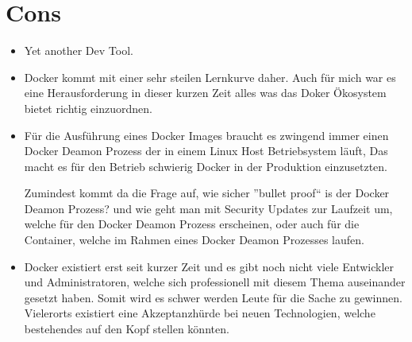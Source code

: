 \section{Cons}

\begin{itemize}

\item Yet another Dev Tool.

\item Docker kommt mit einer sehr steilen Lernkurve daher. Auch für mich war es eine Herausforderung
in dieser kurzen Zeit alles was das Doker Ökosystem bietet richtig einzuordnen.

\item Für die Ausführung eines Docker Images braucht es zwingend immer einen Docker Deamon Prozess der
in einem Linux Host Betriebsystem läuft, Das macht es für den Betrieb schwierig Docker in der
Produktion einzusetzten.

Zumindest kommt da die Frage auf, wie sicher ”bullet proof“ is der Docker Deamon Prozess? und wie
geht man mit Security Updates zur Laufzeit um, welche für den Docker Deamon Prozess erscheinen,
oder auch für die Container, welche im Rahmen eines Docker Deamon Prozesses laufen.

\item Docker existiert erst seit kurzer Zeit und es gibt noch nicht viele Entwickler und
Administratoren, welche sich professionell mit diesem Thema auseinander gesetzt haben. Somit wird
es schwer werden Leute für die Sache zu gewinnen. Vielerorts existiert eine Akzeptanzhürde bei
neuen Technologien, welche bestehendes auf den Kopf stellen könnten.

\end{itemize}